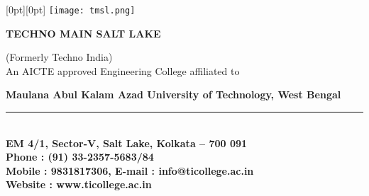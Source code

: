 \thispagestyle{empty}

\begin{adjustwidth}{-0.7cm}{-0.7cm}

\vspace*{-2cm}

\noindent
\begin{minipage}[t]{0.15\textwidth}
    \raisebox{-0.72cm}[0pt][0pt]{%
      \texttt{[image: tmsl.png]}%
    }
\end{minipage}%
\hfill
\begin{minipage}{0.89\textwidth}
  \raggedleft
  {\Huge\bfseries\textcolor{blue!50!black}{TECHNO MAIN SALT LAKE}}\\[0.08em]
  {\fontsize{9.25}{11}\selectfont
  {\selectfont(Formerly Techno India)} \\[0.07em]
  {\fontsize{9.25}{11}\selectfont
    {\selectfont An AICTE approved Engineering College affiliated to} \\[0.07em]
  }
  
  {\fontsize{9.25}{11}\selectfont
    {\selectfont \textbf{Maulana Abul Kalam Azad University of Technology, West Bengal}}
    \\
  }
  
  }
  
  \vspace{-0.7em}
  \textcolor{red!50!black}{\rule{\linewidth}{0.5mm}}
  \\[0.05em]
  {\footnotesize
    \textbf{{\selectfont EM 4/1, Sector-V, Salt Lake, Kolkata – 700 091}} \\[0.07em]
    \textbf{{\selectfont Phone : (91) 33-2357-5683/84}} \\[0.08em]
    \textbf{{\selectfont Mobile : 9831817306, E-mail : info@ticollege.ac.in}} \\[0.07em]
    \noindent\hspace*{\fill}\textbf{{\selectfont Website : www.ticollege.ac.in}} \\[0.07em]
  }
\end{minipage}

\end{adjustwidth}




